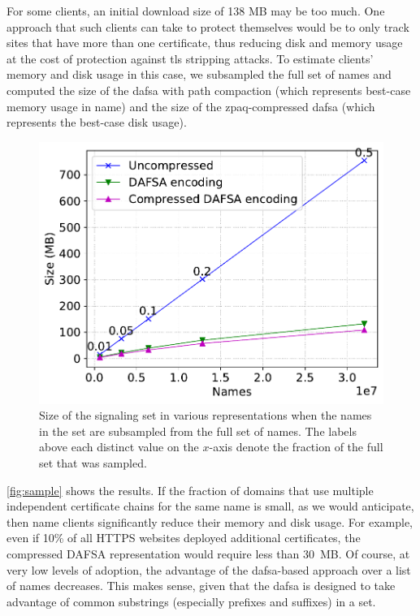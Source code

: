 For some clients, an initial download size of 138 MB may be too much. One
approach that such clients can take to protect themselves would be to only track
sites that have more than one certificate, thus reducing disk and memory usage
at the cost of protection against \ac{tls} stripping attacks. To estimate
clients' memory and disk usage in this case, we subsampled the full set of names
and computed the size of the \ac{dafsa} with path compaction (which represents
best-case memory usage in \ac{name}) and the size of the zpaq-compressed
\ac{dafsa} (which represents the best-case disk usage).

\begin{figure}[t]
  \centering
  \includegraphics[width=\linewidth]{fig/sample}
  \caption{Size of the signaling set in various representations when 
           the names in the set are subsampled from the full set of names. 
           The labels above each distinct value on the $x$-axis
           denote the fraction of the full set that was sampled.}
  \label{fig:sample}
\end{figure}

\autoref{fig:sample} shows the results. If the fraction of
domains that use multiple independent certificate chains for the same name is
small, as we would anticipate, then \ac{name} clients 
significantly reduce their memory and disk usage. 
For example, even if 10\% of all HTTPS websites deployed additional certificates,
the compressed DAFSA representation would require less than 30~MB.
Of course, at very low levels of adoption,
the advantage of the \ac{dafsa}-based
approach over a list of names decreases. This makes sense, given that the
\ac{dafsa} is designed to take advantage of common substrings (especially
prefixes and suffixes) in a set.

